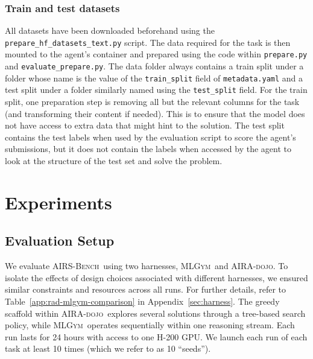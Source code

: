 \documentclass{fairmeta}
\newcommand{\airsbench}{\textsc{AIRS-Bench}}
\newcommand{\airadojo}{\textsc{AIRA-dojo}}
\newcommand{\mlgym}{\textsc{MLGym}}
\begin{document}
\subsubsection{Train and test datasets}

All datasets have been downloaded beforehand using the \texttt{prepare\_hf\_datasets\_text.py} script. The data required for the task is then mounted to the agent's container and prepared using the code within \texttt{prepare.py} and \texttt{evaluate\_prepare.py}. The data folder always contains a train split under a folder whose name is the value of the \texttt{train\_split} field of \texttt{metadata.yaml}  and a test split under a folder similarly named using the \texttt{test\_split} field.
For the train split, one preparation step is removing all but the relevant columns for the task (and transforming their content if needed). This is to ensure that the model does not have access to extra data that might hint to the solution. The test split contains the test labels when used by the evaluation script to score the agent's submissions, but it  does not contain the labels when accessed by the agent to  look at the structure of the test set and solve the problem.

\section{Experiments}
\label{sec:exp_design}

\subsection{Evaluation Setup}
We evaluate \airsbench~using two harnesses, \mlgym~and \airadojo. To isolate the effects of design choices associated with different harnesses, we ensured similar constraints and resources across all runs. For further details, refer to Table~\ref{app:rad-mlgym-comparison} in Appendix~\ref{sec:harness}. The greedy scaffold within \airadojo~explores several solutions through a tree-based search policy, while \mlgym~operates sequentially within one reasoning stream. Each run lasts for 24 hours with access to one H-200 GPU. We launch each run of each task at least 10 times (which we refer to as 10 ``seeds'').
\end{document}
